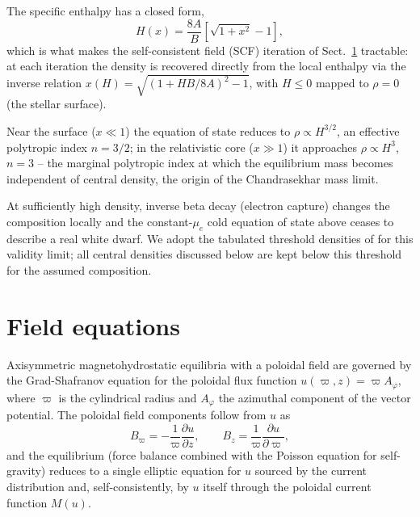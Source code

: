 \documentclass{aa}
\begin{document}
The specific enthalpy has a closed form,
\begin{equation}
H(x) = \frac{8A}{B}\left[\sqrt{1+x^2} - 1\right],
\end{equation}
which is what makes the self-consistent field (SCF) iteration of
Sect.~\ref{sec:field-eq} tractable: at each iteration the density is
recovered directly from the local enthalpy via the inverse relation
$x(H) = \sqrt{(1+HB/8A)^2 - 1}$, with $H \le 0$ mapped to $\rho = 0$
(the stellar surface).

Near the surface ($x \ll 1$) the equation of state reduces to
$\rho \propto H^{3/2}$, an effective polytropic index $n=3/2$; in the
relativistic core ($x \gg 1$) it approaches $\rho \propto H^3$,
$n=3$ -- the marginal polytropic index at which the equilibrium mass
becomes independent of central density, the origin of the
Chandrasekhar mass limit.

At sufficiently high density, inverse beta decay (electron capture)
changes the composition locally and the constant-$\mu_e$ cold equation
of state above ceases to describe a real white dwarf. We adopt the
tabulated threshold densities of \citet{boshkayev2013} for this
validity limit; all central densities discussed below are kept below
this threshold for the assumed composition.


\section{Field equations}
\label{sec:field-eq}

Axisymmetric magnetohydrostatic equilibria with a poloidal field are
governed by the Grad-Shafranov equation \citep{grad1958,shafranov1966}
for the poloidal flux function $u(\varpi,z) = \varpi A_\varphi$, where
$\varpi$ is the cylindrical radius and $A_\varphi$ the azimuthal
component of the vector potential. The poloidal field components follow
from $u$ as
\begin{equation}
B_\varpi = -\frac{1}{\varpi}\frac{\partial u}{\partial z}, \qquad
B_z = \frac{1}{\varpi}\frac{\partial u}{\partial \varpi},
\end{equation}
and the equilibrium (force balance combined with the Poisson equation
for self-gravity) reduces to a single elliptic equation for $u$ sourced
by the current distribution and, self-consistently, by $u$ itself
through the poloidal current function $M(u)$.
\end{document}
